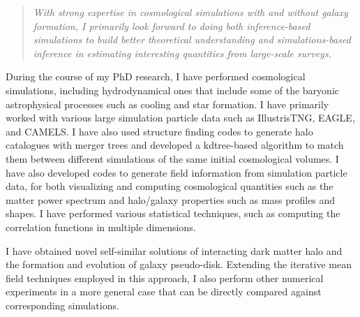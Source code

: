 \documentclass[12pt]{article}
\begin{document}
\begin{quote}
    \textit{With strong expertise in cosmological simulations with and without galaxy formation, I primarily look forward to doing both inference-based simulations to build better theoretical understanding and simulations-based inference in estimating interesting quantities from large-scale surveys.}
\end{quote}

During the course of my PhD research, I have performed cosmological simulations, including hydrodynamical ones that include some of the baryonic astrophysical processes such as cooling and star formation. I have primarily worked with various large simulation particle data such as IllustrisTNG, EAGLE, and CAMELS. I have also used structure finding codes to generate halo catalogues with merger trees and developed a kdtree-based algorithm to match them between different simulations of the same initial cosmological volumes. I have also developed codes to generate field information from simulation particle data, for both visualizing and computing cosmological quantities such as the matter power spectrum and halo/galaxy properties such as mass profiles and shapes. I have performed various statistical techniques, such as computing the correlation functions in multiple dimensions. 

I have obtained novel self-similar solutions of interacting dark matter halo and the formation and evolution of galaxy pseudo-disk. Extending the iterative mean field techniques employed in this approach, I also perform other numerical experiments in a more general case that can be directly compared against corresponding simulations.



\end{document}
